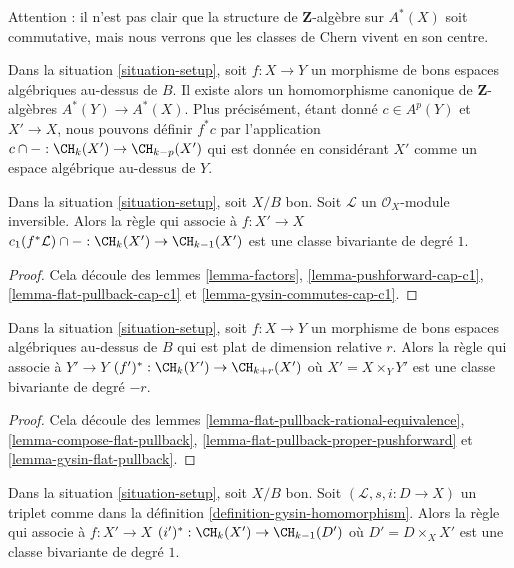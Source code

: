 \noindent
Attention : il n'est pas clair que la structure de $\mathbf{Z}$-algèbre sur
$A^*(X)$ soit commutative, mais nous verrons que les classes de Chern vivent
en son centre.

\begin{remark}
\label{remark-pullback-cohomology}
Dans la situation \ref{situation-setup}, soit $f : X \to Y$ un morphisme de
bons espaces algébriques au-dessus de $B$. Il existe alors un homomorphisme canonique de
$\mathbf{Z}$-algèbres $A^*(Y) \to A^*(X)$. Plus précisément, étant donné $c \in
A^p(Y)$ et $X' \to X$, nous pouvons définir $f^*c$ par
l'application $c \cap - : \CH_k(X') \to \CH_{k - p}(X')$ qui est donnée en
considérant $X'$ comme un espace algébrique au-dessus de $Y$.
\end{remark}

\begin{lemma}
\label{lemma-cap-c1-bivariant}
Dans la situation \ref{situation-setup}, soit $X/B$ bon. Soit
$\mathcal{L}$ un $\mathcal{O}_X$-module inversible. Alors la règle qui
associe à $f : X' \to X$ $c_1(f^*\mathcal{L}) \cap - : \CH_k(X') \to \CH_{k -
1}(X')$ est une classe bivariante de degré $1$.
\end{lemma}

\begin{proof}
Cela découle des lemmes \ref{lemma-factors}, \ref{lemma-pushforward-cap-c1},
\ref{lemma-flat-pullback-cap-c1} et \ref{lemma-gysin-commutes-cap-c1}.
\end{proof}

\begin{lemma}
\label{lemma-flat-pullback-bivariant}
Dans la situation \ref{situation-setup}, soit $f : X \to Y$ un morphisme de
bons espaces algébriques au-dessus de $B$ qui est plat de dimension relative $r$.
Alors la règle qui associe à $Y' \to Y$ $(f')^* : \CH_k(Y') \to \CH_{k +
r}(X')$ où $X' = X \times_Y Y'$ est une classe bivariante de degré $-r$.
\end{lemma}

\begin{proof}
Cela découle des lemmes \ref{lemma-flat-pullback-rational-equivalence},
\ref{lemma-compose-flat-pullback},
\ref{lemma-flat-pullback-proper-pushforward} et
\ref{lemma-gysin-flat-pullback}.
\end{proof}

\begin{lemma}
\label{lemma-gysin-bivariant}
Dans la situation \ref{situation-setup}, soit $X/B$ bon. Soit
$(\mathcal{L}, s, i : D \to X)$ un triplet comme dans la définition
\ref{definition-gysin-homomorphism}. Alors la règle qui associe à $f : X'
\to X$ $(i')^* : \CH_k(X') \to \CH_{k - 1}(D')$ où $D' = D \times_X X'$ est
une classe bivariante de degré $1$.
\end{lemma}

